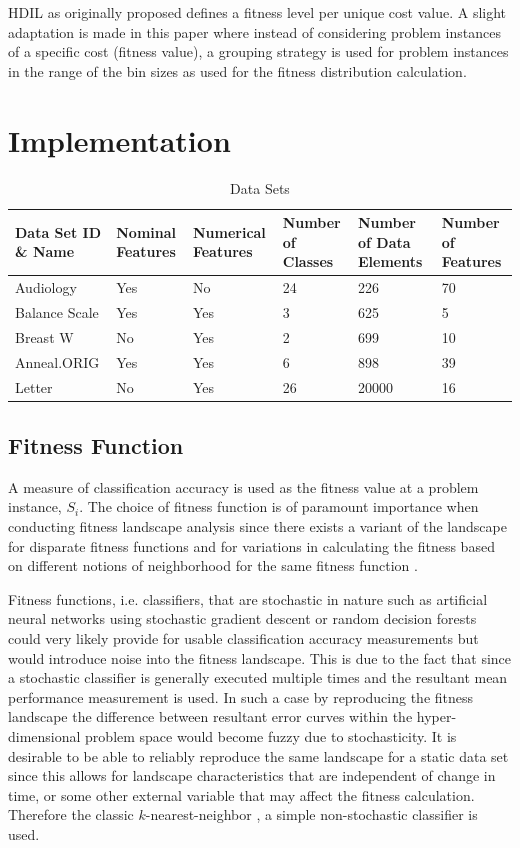 \documentclass[journal,comsoc]{IEEEtran}
\begin{document}
HDIL as originally proposed defines a fitness level per unique cost value. A slight adaptation is made in this paper where instead of considering problem instances of a specific cost (fitness value), a grouping strategy is used for problem instances in the range of the bin sizes as used for the fitness distribution calculation.

\section{Implementation}


\begin{table}[t]
\centering
\caption{Data Sets}
\label{table1}
\begin{tabular}{|l|l|l|l|l|l|}
\hline
\textbf{Data Set ID \& Name} & \textbf{Nominal Features} & \textbf{Numerical Features} & \textbf{Number of Classes} & \textbf{Number of Data Elements} & \textbf{Number of Features} \\ \hline
Audiology & Yes & No & 24 & 226 & 70 \\ \hline
Balance Scale & Yes & Yes & 3 & 625 & 5 \\ \hline
Breast W & No & Yes & 2 & 699 & 10 \\ \hline
Anneal.ORIG & Yes & Yes & 6 & 898 & 39 \\ \hline
Letter & No & Yes & 26 & 20000 & 16 \\ \hline
\end{tabular}
\end{table}

\subsection{Fitness Function}
A measure of classification accuracy is used as the fitness value at a problem instance, $S_i$. The choice of fitness function is of paramount importance when conducting fitness landscape analysis since there exists a variant of the landscape for disparate fitness functions and for variations in calculating the fitness based on different notions of neighborhood for the same fitness function \cite{malan2013survey}.

 Fitness functions, i.e. classifiers, that are stochastic in nature such as artificial neural networks using stochastic gradient descent or random decision forests could very likely provide for usable classification accuracy measurements but would introduce noise into the fitness landscape. This is due to the fact that since a stochastic classifier is generally executed multiple times and the resultant mean performance measurement is used. In such a case by reproducing the fitness landscape the difference between resultant error curves within the hyper-dimensional problem space would become fuzzy due to stochasticity. It is desirable to be able to reliably reproduce the same landscape for a static data set since this allows for landscape characteristics that are independent of change in time, or some other external variable that may affect the fitness calculation. Therefore the classic $k$-nearest-neighbor \cite{cunningham2007k}, a simple non-stochastic classifier is used.
\end{document}
